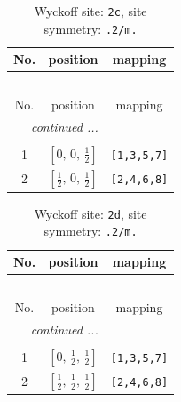 \documentclass[fleqn,8pt]{jsarticle}
\begin{document}
\begin{longtable}{ccc}
\caption{Wyckoff site: {\tt 2c}, site symmetry: {\tt .2/m.}}
 \\
 \hline \hline
No. & position & mapping \\ \hline \endfirsthead

\multicolumn{2}{l}{\tablename\ \thetable{}} \\
 \hline \hline
No. & position & mapping \\ \hline \endhead

 \hline \hline
\multicolumn{2}{r}{\footnotesize\it continued ...} \\ \endfoot

 \hline \hline
\multicolumn{2}{r}{} \\ \endlastfoot

1 & $\left[ 0,\, 0,\, \frac{1}{2} \right]$ & {\tt [1,3,5,7]} \\ \hline
2 & $\left[ \frac{1}{2},\, 0,\, \frac{1}{2} \right]$ & {\tt [2,4,6,8]} \\
\end{longtable}
\renewcommand{\arraystretch}{1.2}
\begin{longtable}{ccc}
\caption{Wyckoff site: {\tt 2d}, site symmetry: {\tt .2/m.}}
 \\
 \hline \hline
No. & position & mapping \\ \hline \endfirsthead

\multicolumn{2}{l}{\tablename\ \thetable{}} \\
 \hline \hline
No. & position & mapping \\ \hline \endhead

 \hline \hline
\multicolumn{2}{r}{\footnotesize\it continued ...} \\ \endfoot

 \hline \hline
\multicolumn{2}{r}{} \\ \endlastfoot

1 & $\left[ 0,\, \frac{1}{2},\, \frac{1}{2} \right]$ & {\tt [1,3,5,7]} \\ \hline
2 & $\left[ \frac{1}{2},\, \frac{1}{2},\, \frac{1}{2} \right]$ & {\tt [2,4,6,8]} \\
\end{longtable}
\renewcommand{\arraystretch}{1.2}
\end{document}
